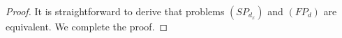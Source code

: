 \documentclass[11pt]{article}
\theoremstyle{definition}
\theoremstyle{remark}
\newtheorem{remark}[theorem]{Remark}
\numberwithin{equation}{section}
\begin{document}
\begin{proof}
It is straightforward to derive that problems  $(SP_{d_x})$ and $(FP_d)$ are equivalent.
We complete the proof.
\end{proof}



\end{document}

